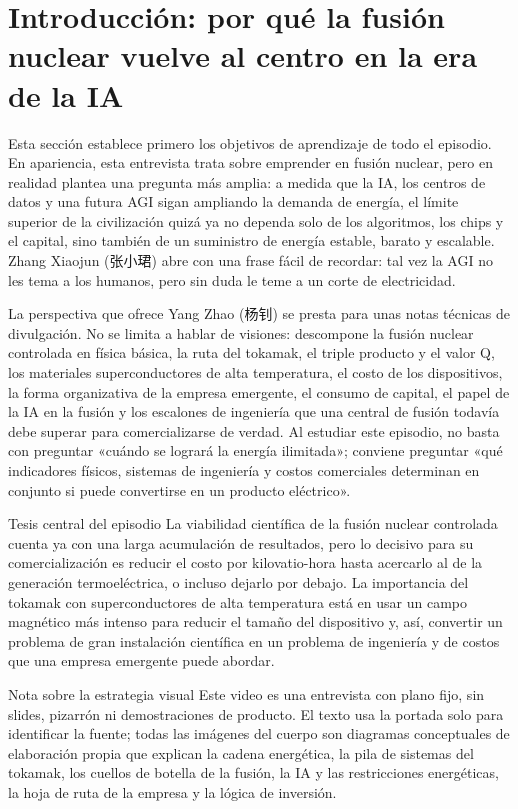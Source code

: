 \section{Introducción: por qué la fusión nuclear vuelve al centro en la era de la IA}

Esta sección establece primero los objetivos de aprendizaje de todo el episodio. En apariencia, esta entrevista trata sobre emprender en fusión nuclear, pero en realidad plantea una pregunta más amplia: a medida que la IA, los centros de datos y una futura AGI sigan ampliando la demanda de energía, el límite superior de la civilización quizá ya no dependa solo de los algoritmos, los chips y el capital, sino también de un suministro de energía estable, barato y escalable. Zhang Xiaojun (张小珺) abre con una frase fácil de recordar: tal vez la AGI no les tema a los humanos, pero sin duda le teme a un corte de electricidad.

La perspectiva que ofrece Yang Zhao (杨钊) se presta para unas notas técnicas de divulgación. No se limita a hablar de visiones: descompone la fusión nuclear controlada en física básica, la ruta del tokamak, el triple producto y el valor Q, los materiales superconductores de alta temperatura, el costo de los dispositivos, la forma organizativa de la empresa emergente, el consumo de capital, el papel de la IA en la fusión y los escalones de ingeniería que una central de fusión todavía debe superar para comercializarse de verdad. Al estudiar este episodio, no basta con preguntar «cuándo se logrará la energía ilimitada»; conviene preguntar «qué indicadores físicos, sistemas de ingeniería y costos comerciales determinan en conjunto si puede convertirse en un producto eléctrico».

\begin{importantbox}{Tesis central del episodio}
La viabilidad científica de la fusión nuclear controlada cuenta ya con una larga acumulación de resultados, pero lo decisivo para su comercialización es reducir el costo por kilovatio-hora hasta acercarlo al de la generación termoeléctrica, o incluso dejarlo por debajo. La importancia del tokamak con superconductores de alta temperatura está en usar un campo magnético más intenso para reducir el tamaño del dispositivo y, así, convertir un problema de gran instalación científica en un problema de ingeniería y de costos que una empresa emergente puede abordar.
\end{importantbox}

\begin{knowledgebox}{Nota sobre la estrategia visual}
Este video es una entrevista con plano fijo, sin slides, pizarrón ni demostraciones de producto. El texto usa la portada solo para identificar la fuente; todas las imágenes del cuerpo son diagramas conceptuales de elaboración propia que explican la cadena energética, la pila de sistemas del tokamak, los cuellos de botella de la fusión, la IA y las restricciones energéticas, la hoja de ruta de la empresa y la lógica de inversión.
\end{knowledgebox}


